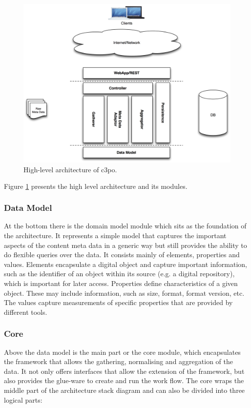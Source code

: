 \begin{figure}[htb]
\begin{center}
\includegraphics[width=5.5in]{figures/architecture/c3po_highlevel_architecture.png}
\caption{High-level architecture of c3po.}
\label{fig:architecture_highlevel}
\end{center}
\end{figure}

Figure \ref{fig:architecture_highlevel} presents the high level architecture and its modules.

\subsubsection{Data Model}

At the bottom there is the domain model module which sits as the foundation of the architecture. It represents a simple model that captures the important aspects of the content meta data in a generic way but still provides the ability to do flexible queries over the data. It consists mainly of elements, properties and values. Elements encapsulate a digital object and capture important information, such as the identifier of an object within its source (e.g. a digital repository), which is important for later access. Properties define characteristics of a given object. These may include information, such as size, format, format version, etc. The values capture measurements of specific properties that are provided by different tools.

\subsubsection{Core}
Above the data model is the main part or the core module, which encapsulates the framework that allows the gathering, normalising and aggregation of the data. It not only offers interfaces that allow the extension of the framework, but also provides the glue-ware to create and run the work flow. The core wraps the middle part of the architecture stack diagram and can also be divided into three logical parts:

